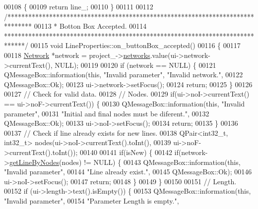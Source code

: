 \begin{DoxyCode}
00108 \{
00109   \textcolor{keywordflow}{return} line\_;
00110 \}
00111 
00112 \textcolor{comment}{/*******************************************************************************}
00113 \textcolor{comment}{ * Botton Box Accepted.}
00114 \textcolor{comment}{ ******************************************************************************/}
00115 \textcolor{keywordtype}{void} LineProperties::on\_buttonBox\_accepted()
00116 \{
00117 
00118   \hyperlink{class_network}{Network} *network = project\_->\hyperlink{class_project_aa98126154cab59769a431668e6f17daf}{networks}.value(ui->network->currentText(), NULL);
00119 
00120   \textcolor{keywordflow}{if} (network == NULL) \{
00121     QMessageBox::information(\textcolor{keyword}{this}, \textcolor{stringliteral}{"Invalid parameter"}, \textcolor{stringliteral}{"Invalid network."},
00122                              QMessageBox::Ok);
00123     ui->network->setFocus();
00124     \textcolor{keywordflow}{return};
00125   \}
00126 
00127   \textcolor{comment}{// Check for valid data.}
00128   \textcolor{comment}{// Nodes.}
00129   \textcolor{keywordflow}{if}(ui->noI->currentText() == ui->noF->currentText()) \{
00130     QMessageBox::information(\textcolor{keyword}{this}, \textcolor{stringliteral}{"Invalid parameter"},
00131                              \textcolor{stringliteral}{"Initial and final nodes must be diferent."},
00132                              QMessageBox::Ok);
00133     ui->noI->setFocus();
00134     \textcolor{keywordflow}{return};
00135   \}
00136 
00137   \textcolor{comment}{// Check if line already exists for new lines.}
00138   QPair<int32\_t, int32\_t> nodes(ui->noI->currentText().toInt(),
00139                                 ui->noF->currentText().toInt());
00140 
00141   \textcolor{keywordflow}{if}(isNew) \{
00142     \textcolor{keywordflow}{if}(network->\hyperlink{group___graphics_ga8f090b85a7779695cb9f05b6395b3044}{getLineByNodes}(nodes) != NULL) \{
00143       QMessageBox::information(\textcolor{keyword}{this}, \textcolor{stringliteral}{"Invalid parameter"},
00144                                \textcolor{stringliteral}{"Line already exist."},
00145                                QMessageBox::Ok);
00146       ui->noI->setFocus();
00147       \textcolor{keywordflow}{return};
00148     \}
00149   \}
00150 
00151   \textcolor{comment}{// Length.}
00152   \textcolor{keywordflow}{if} (ui->length->text().isEmpty()) \{
00153     QMessageBox::information(\textcolor{keyword}{this}, \textcolor{stringliteral}{"Invalid parameter"},
00154                              \textcolor{stringliteral}{"Parameter Length is empty."},

\end{DoxyCode}
